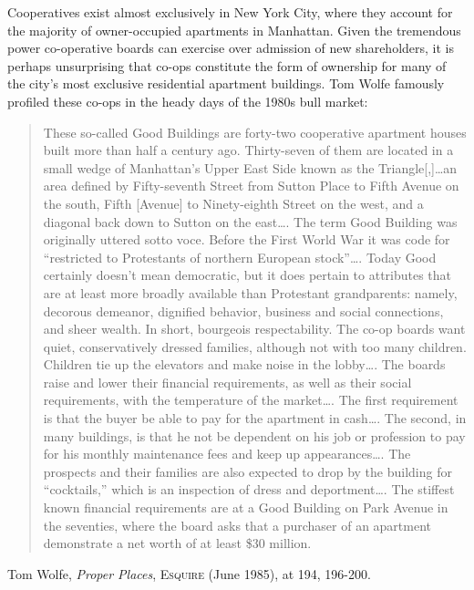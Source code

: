 Cooperatives exist almost exclusively in New York City, where they account for
the majority of owner-occupied apartments in Manhattan. Given the tremendous
power co-operative boards can exercise over admission of new shareholders, it is
perhaps unsurprising that co-ops constitute the form of ownership for many of
the city's most exclusive residential apartment buildings. Tom Wolfe famously
profiled these co-ops in the heady days of the 1980s bull market:
\begin{quote}
These so-called Good Buildings are forty-two cooperative apartment houses built
more than half a century ago. Thirty-seven of them are located in a small wedge
of Manhattan's Upper East Side known as the Triangle[,]\ldots an area defined by
Fifty-seventh Street from Sutton Place to Fifth Avenue on the south, Fifth
[Avenue] to Ninety-eighth Street on the west, and a diagonal back down to Sutton
on the east\ldots . The term Good Building was originally uttered sotto voce.
Before the First World War it was code for ``restricted to Protestants of
northern European stock''\ldots . Today Good certainly doesn't mean democratic,
but it does pertain to attributes that are at least more broadly available than
Protestant grandparents: namely, decorous demeanor, dignified behavior, business
and social connections, and sheer wealth. In short, bourgeois respectability.
The co-op boards want quiet, conservatively dressed families, although not with
too many children. Children tie up the elevators and make noise in the
lobby\ldots . The boards raise and lower their financial requirements, as well
as their social requirements, with the temperature of the market\ldots . The
first requirement is that the buyer be able to pay for the apartment in
cash\ldots . The second, in many buildings, is that he not be dependent on his
job or profession to pay for his monthly maintenance fees and keep up
appearances\ldots . The prospects and their families are also expected to drop
by the building for ``cocktails,'' which is an inspection of dress and
deportment\ldots . The stiffest known financial requirements are at a Good
Building on Park Avenue in the seventies, where the board asks that a purchaser
of an apartment demonstrate a net worth of at least \$30
million.
\end{quote}
Tom Wolfe, \textit{Proper Places}, \textsc{Esquire} (June 1985), at 194,
196-200.


